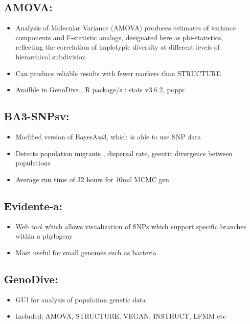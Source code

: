 \documentclass[document.tex]{subfiles}
\begin{document}
    \subsection{AMOVA: }
        \begin{itemize}
        \item Analysis of Molecular Variance (AMOVA) produces estimates of variance components and F-statistic analogs, designated here as phi-statistics, reflecting the correlation of haplotypic diversity at different levels of hierarchical subdivision
        \item Can produce reliable results with fewer markers than STRUCTURE \cite{nelson_2013}
        \item Availble in GenoDive \cite{meirmans_2020}, R package/s : stats v3.6.2, poppr
        \end{itemize} 

    \subsection{BA3-SNPsv: }
         \begin{itemize}
        \item Modified version of BayesAss3, which is able to use SNP data
        \item Detects population migrants , dispersal rate, geentic divergence between populations
        \item Average run time of 32 hours for 10mil MCMC gen 
        \end{itemize} 

    \subsection{Evidente-a: }
        \begin{itemize}
        \item Web tool which allows visualization of SNPs which support specific branches within a phylogeny
        \item Most useful for small genomes such as bacteria
        \end{itemize}
            
    \subsection{GenoDive: }
        \begin{itemize}
        \item GUI for analysis of population genetic data
        \item Included: AMOVA, STRUCTURE, VEGAN, INSTRUCT, LFMM etc
        \end{itemize} 
\end{document}

